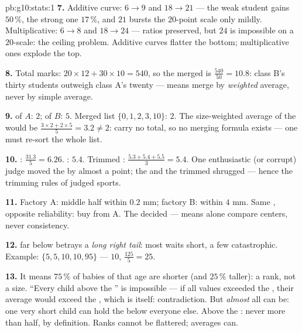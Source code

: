 \begin{solution}{pb:g10:stats:1}
\textbf{7.} Additive curve: $6 \to 9$ and $18 \to 21$ --- the
weak student gains $50\,\%$, the strong one $17\,\%$, and $21$
bursts the $20$-point scale only mildly. Multiplicative:
$6 \to 8$ and $18 \to 24$ --- ratios preserved, but $24$ is
impossible on a $20$-scale: the ceiling problem. Additive
curves flatter the bottom; multiplicative ones explode the
top.

\textbf{8.} Total marks: $20 \times 12 + 30 \times 10 = 540$,
so the merged  is $\frac{540}{50} = 10.8$: class B's thirty
students outweigh class A's twenty --- means merge by
\emph{weighted} average, never by simple average.

\textbf{9.}  of $A$: $2$; of $B$: $5$. Merged list
$\{0, 1, 2, 3, 10\}$:  $2$. The size-weighted average of
the  would be $\frac{3 \times 2 + 2 \times 5}{5} = 3.2
\neq 2$:  carry no total, so no merging formula exists
--- one must re-sort the whole list.

\textbf{10.} : $\frac{31.3}{5} = 6.26$. : $5.4$.
Trimmed : $\frac{5.3 + 5.4 + 5.5}{3} = 5.4$. One
enthusiastic (or corrupt) judge moved the  by almost a
point; the  and the trimmed  shrugged --- hence the
trimming rules of judged sports.

\textbf{11.} Factory A: middle half within $0.2$ mm; factory B:
within $4$ mm. Same , opposite reliability: buy from A. The
 decided --- means alone compare centers,
never consistency.

\textbf{12.}  far below  betrays a \emph{long right
tail}: most waits short, a few catastrophic. Example:
$\{5, 5, 10, 10, 95\}$ ---  $10$, 
$\frac{125}{5} = 25$.

\textbf{13.} It means $75\,\%$ of babies of that age are
shorter (and $25\,\%$ taller): a rank, not a size. ``Every
child above the '' is impossible --- if all values exceeded
the , their average would exceed the , which is itself:
contradiction. But \emph{almost} all can be: one very short
child can hold the  below everyone else. Above the
\emph{}: never more than half, by definition. Ranks
cannot be flattered; averages can.


\end{solution}
